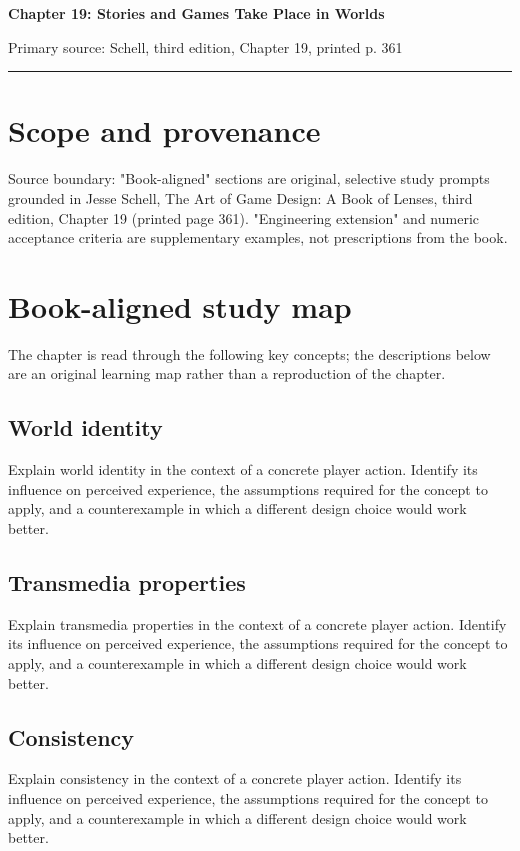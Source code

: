 \documentclass[11pt]{article}
\begin{document}
{\huge\bfseries\color{suiteblue} Chapter 19: Stories and Games Take Place in Worlds}\par
\vspace{0.15in}
{\normalsize\color{suitegray} Primary source: Schell, third edition, Chapter 19, printed p. 361}\par
\vspace{0.15in}\hrule\vspace{0.15in}

\section{Scope and provenance}
Source boundary: "Book-aligned" sections are original, selective study prompts grounded in Jesse Schell, The Art of Game Design: A Book of Lenses, third edition, Chapter 19 (printed page 361). "Engineering extension" and numeric acceptance criteria are supplementary examples, not prescriptions from the book.


\section{Book-aligned study map}
The chapter is read through the following key concepts; the descriptions below are an original learning map rather than a reproduction of the chapter.


\subsection{World identity}
Explain world identity in the context of a concrete player action. Identify its influence on perceived experience, the assumptions required for the concept to apply, and a counterexample in which a different design choice would work better.


\subsection{Transmedia properties}
Explain transmedia properties in the context of a concrete player action. Identify its influence on perceived experience, the assumptions required for the concept to apply, and a counterexample in which a different design choice would work better.


\subsection{Consistency}
Explain consistency in the context of a concrete player action. Identify its influence on perceived experience, the assumptions required for the concept to apply, and a counterexample in which a different design choice would work better.
\end{document}

